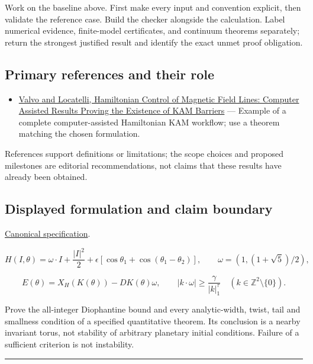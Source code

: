 \documentclass[
  11pt,
]{article}
\providecommand{\tightlist}{%
  \setlength{\itemsep}{0pt}\setlength{\parskip}{0pt}}
\begin{document}
Work on the baseline above. First make every input and convention
explicit, then validate the reference case. Build the checker alongside
the calculation. Label numerical evidence, finite-model certificates,
and continuum theorems separately; return the strongest justified result
and identify the exact unmet proof obligation.

\subsection{Primary references and their role}

\begin{itemize}
\tightlist
\item
  \href{https://arxiv.org/abs/2101.07785}{Valvo and Locatelli,
  Hamiltonian Control of Magnetic Field Lines: Computer Assisted Results
  Proving the Existence of KAM Barriers} --- Example of a complete
  computer-assisted Hamiltonian KAM workflow; use a theorem matching the
  chosen formulation.
\end{itemize}

References support definitions or limitations; the scope choices and
proposed milestones are editorial recommendations, not claims that these
results have already been obtained.

\subsection{Displayed formulation and claim boundary}

\href{https://github.com/rick-stevens-ai/Pure-Thought/blob/main/PRDs/26-KAM-Theory-Planetary-Stability.md}{Canonical
specification}.

\[H(I,\theta)=\omega\cdot I+\frac{|I|^2}{2}
+\epsilon[\cos\theta_1+\cos(\theta_1-\theta_2)],
\qquad\omega=(1,(1+\sqrt5)/2),\]

\[E(\theta)=X_H(K(\theta))-DK(\theta)\omega,
\qquad |k\cdot\omega|\ge\frac\gamma{|k|_1^\tau}
\quad(k\in\mathbb Z^2\setminus\{0\}).\]

Prove the all-integer Diophantine bound and every analytic-width, twist,
tail and smallness condition of a specified quantitative theorem. Its
conclusion is a nearby invariant torus, not stability of arbitrary
planetary initial conditions. Failure of a sufficient criterion is not
instability.

\begin{center}\rule{0.5\linewidth}{0.5pt}\end{center}
\end{document}
